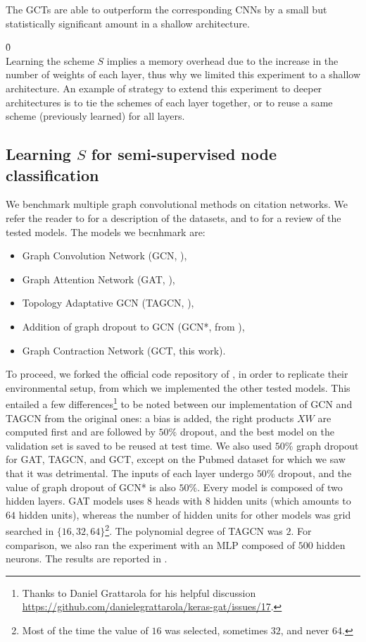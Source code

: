 The GCTs are able to outperform the corresponding CNNs by a small but statistically significant amount in a shallow architecture.

\h{0}\\

Learning the scheme $S$ implies a memory overhead due to the increase in the number of weights of each layer, thus why we limited this experiment to a shallow architecture. An example of strategy to extend this experiment to deeper architectures is to tie the schemes of each layer together, or to reuse a same scheme (previously learned) for all layers.


\subsection{Learning $S$ for semi-supervised node classification}
\label{sec:lss}

We benchmark multiple graph convolutional methods on citation networks. We refer the reader to  for a description of the datasets, and to  for a review of the tested models. The models we becnhmark are:
\begin{itemize}[nolistsep,noitemsep]
 \item Graph Convolution Network (GCN, \cite{kipf2016semi}),
 \item Graph Attention Network (GAT, \cite{velickovic2017graph}),
 \item Topology Adaptative GCN (TAGCN,  \cite{du2017topology}),
 \item Addition of graph dropout to GCN (GCN*, from ),
 \item Graph Contraction Network (GCT, this work).
\end{itemize}

To proceed, we forked the official code repository of \cite{velickovic2017graph}, in order to replicate their environmental setup, from which we implemented the other tested models. This entailed a few differences\footnote{Thanks to Daniel Grattarola for his helpful discussion \url{https://github.com/danielegrattarola/keras-gat/issues/17}.} to be noted between our implementation of GCN and TAGCN from the original ones: a bias is added, the right products $XW$ are computed first and are followed by $50\%$ dropout, and the best model on the validation set is saved to be reused at test time. We also used $50\%$ graph dropout for GAT, TAGCN, and GCT, except on the Pubmed dataset for which we saw that it was detrimental. The inputs of each layer undergo $50\%$ dropout, and the value of graph dropout of GCN* is also $50\%$. Every model is composed of two hidden layers. GAT models uses $8$ heads with $8$ hidden units (which amounts to $64$ hidden units), whereas the number of hidden units for other models was grid searched in $\{16, 32, 64\}$\footnote{Most of the time the value of $16$ was selected, sometimes $32$, and never $64$.}. The polynomial degree of TAGCN was $2$. For comparison, we also ran the experiment with an MLP composed of $500$ hidden neurons. The results are reported in .

